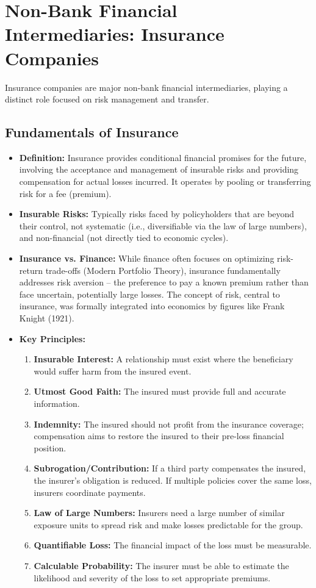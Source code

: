 \section{Non-Bank Financial Intermediaries: Insurance Companies}

Insurance companies are major non-bank financial intermediaries, playing a distinct role focused on risk management and transfer.

\subsection{Fundamentals of Insurance}
\begin{itemize}
    \item \textbf{Definition:} Insurance provides conditional financial promises for the future, involving the acceptance and management of insurable risks and providing compensation for actual losses incurred. It operates by pooling or transferring risk for a fee (premium).
    \item \textbf{Insurable Risks:} Typically risks faced by policyholders that are beyond their control, not systematic (i.e., diversifiable via the law of large numbers), and non-financial (not directly tied to economic cycles).
    \item \textbf{Insurance vs. Finance:} While finance often focuses on optimizing risk-return trade-offs (Modern Portfolio Theory), insurance fundamentally addresses risk aversion – the preference to pay a known premium rather than face uncertain, potentially large losses. The concept of risk, central to insurance, was formally integrated into economics by figures like Frank Knight (1921).
    \item \textbf{Key Principles:}
        \begin{enumerate}
            \item \textbf{Insurable Interest:} A relationship must exist where the beneficiary would suffer harm from the insured event.
            \item \textbf{Utmost Good Faith:} The insured must provide full and accurate information.
            \item \textbf{Indemnity:} The insured should not profit from the insurance coverage; compensation aims to restore the insured to their pre-loss financial position.
            \item \textbf{Subrogation/Contribution:} If a third party compensates the insured, the insurer's obligation is reduced. If multiple policies cover the same loss, insurers coordinate payments.
            \item \textbf{Law of Large Numbers:} Insurers need a large number of similar exposure units to spread risk and make losses predictable for the group.
            \item \textbf{Quantifiable Loss:} The financial impact of the loss must be measurable.
            \item \textbf{Calculable Probability:} The insurer must be able to estimate the likelihood and severity of the loss to set appropriate premiums.
        \end{enumerate}
\end{itemize}


